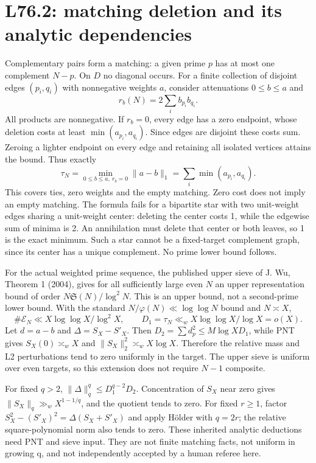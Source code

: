 \documentclass[11pt,a4paper]{article}
\newcommand{\Sg}{\mathfrak S}\newcommand{\e}{\mathrm e}
\begin{document}
\section{L76.2: matching deletion and its analytic dependencies}
Complementary pairs form a matching: a given prime $p$ has at most one complement $N-p$. On $D$ no diagonal occurs. For a finite collection of disjoint edges $(p_i,q_i)$ with nonnegative weights $a$, consider attenuations $0\le b\le a$ and
\[
 r_b(N)=2\sum_i b_{p_i}b_{q_i}.
\]
All products are nonnegative. If $r_b=0$, every edge has a zero endpoint, whose deletion costs at least $\min(a_{p_i},a_{q_i})$. Since edges are disjoint these costs sum. Zeroing a lighter endpoint on every edge and retaining all isolated vertices attains the bound. Thus exactly
\[
 \tau_N=\min_{0\le b\le a,\ r_b=0}\|a-b\|_1
       =\sum_i\min(a_{p_i},a_{q_i}).
\]
This covers ties, zero weights and the empty matching. Zero cost does not imply an empty matching. The formula fails for a bipartite star with two unit-weight edges sharing a unit-weight center: deleting the center costs 1, while the edgewise sum of minima is 2. An annihilation must delete that center or both leaves, so 1 is the exact minimum. Such a star cannot be a fixed-target complement graph, since its center has a unique complement. No prime lower bound follows.

For the actual weighted prime sequence, the published upper sieve of J. Wu, Theorem 1 (2004), gives for all sufficiently large even $N$ an upper representation bound of order $N\Sg(N)/\log^2N$. This is an upper bound, not a second-prime lower bound. With the standard $N/\varphi(N)\ll\log\log N$ bound and $N\asymp X$,
\[
 \#\mathcal E_N\ll X\log\log X/\log^2X,\qquad
 D_1=\tau_N\ll_w X\log\log X/\log X=o(X).
\]
Let $d=a-b$ and $\Delta=S_X-S'_X$. Then $D_2=\sum d_p^2\le M\log X D_1$, while PNT gives $S_X(0)\asymp_w X$ and $\|S_X\|_2^2\asymp_w X\log X$. Therefore the relative mass and L2 perturbations tend to zero uniformly in the target. The upper sieve is uniform over even targets, so this extension does not require $N-1$ composite.

For fixed $q>2$, $\|\Delta\|_q^q\le D_1^{q-2}D_2$. Concentration of $S_X$ near zero gives $\|S_X\|_q\gg_w X^{1-1/q}$, and the quotient tends to zero. For fixed $r\ge1$, factor $S_X^2-(S'_X)^2=\Delta(S_X+S'_X)$ and apply H\"older with $q=2r$; the relative square-polynomial norm also tends to zero. These inherited analytic deductions need PNT and sieve input. They are not finite matching facts, not uniform in growing q, and not independently accepted by a human referee here.
\newpage
\end{document}
